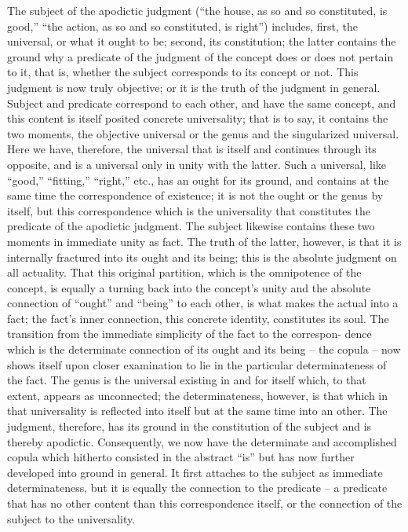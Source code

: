 The subject of the apodictic judgment
(“the house, as so and so constituted, is good,”
“the action, as so and so constituted, is right”)
includes,
first, the universal, or what it ought to be; second, its constitution;
the latter contains the ground why a predicate of the judgment of the concept
does or does not pertain to it,
that is, whether the subject corresponds to its concept or not.
This judgment is now truly objective; or it is the truth of the judgment
in general.
Subject and predicate correspond to each other, and have the
same concept, and this content is itself posited concrete universality; that is
to say, it contains the two moments, the objective universal or the genus
and the singularized universal.
Here we have, therefore, the universal that is itself and continues through its opposite, and is a universal only in unity
with the latter.
Such a universal, like “good,” “fitting,” “right,” etc., has
an ought for its ground, and contains at the same time the correspondence
of existence;
it is not the ought or the genus by itself, but this correspondence
which is the universality that constitutes the predicate of the apodictic judgment.
The subject likewise contains these two moments in immediate unity as fact.
The truth of the latter, however, is that it is internally fractured into
its ought and its being;
this is the absolute judgment on all actuality.
That this original partition, which is the omnipotence of the concept, is equally
a turning back into the concept's unity and the absolute connection of
“ought” and “being” to each other, is what makes the actual into a fact;
 the fact's inner connection, this concrete identity, constitutes its soul.
The transition from the immediate simplicity of the fact to the correspon-
dence which is the determinate connection of its ought and its being – the
copula – now shows itself upon closer examination to lie in the particular
determinateness of the fact. The genus is the universal existing in and for
itself which, to that extent, appears as unconnected; the determinateness,
however, is that which in that universality is reflected into itself but at the
same time into an other.
The judgment, therefore, has its ground in the
constitution of the subject and is thereby apodictic.
Consequently, we now have the determinate and accomplished copula
which hitherto consisted in
the abstract “is” but has now further developed into ground in general.
It first attaches to the subject as immediate determinateness, but it is equally
the connection to the predicate – a predicate that has no other content than
this correspondence itself, or the connection of the subject to the universality.
